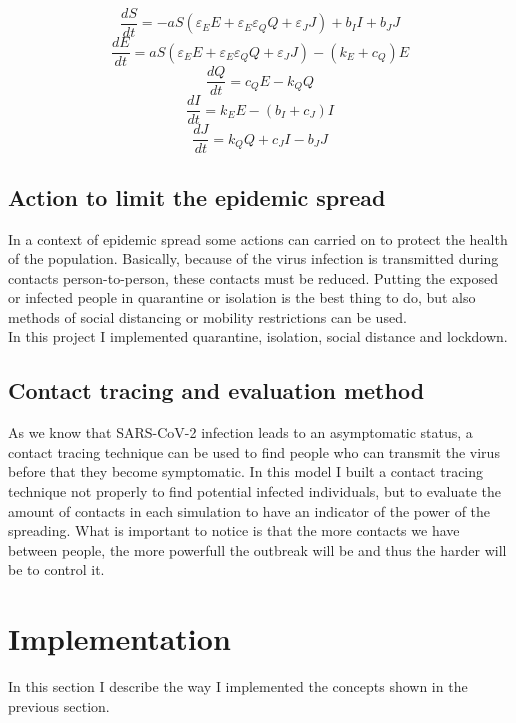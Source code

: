 \documentclass[12pt]{llncs}
\begin{document}
$$\frac{dS}{dt} = -aS(\varepsilon_EE + \varepsilon_E\varepsilon_QQ + \varepsilon_JJ) + b_II + b_JJ$$
$$\frac{dE}{dt} = aS(\varepsilon_EE + \varepsilon_E\varepsilon_QQ + \varepsilon_JJ) - (k_E + c_Q)E$$
$$\frac{dQ}{dt} = c_QE - k_QQ$$
$$\frac{dI}{dt} = k_EE - (b_I + c_J)I$$
$$\frac{dJ}{dt} = k_QQ + c_JI - b_JJ$$

\subsection{Action to limit the epidemic spread}
In a context of epidemic spread some actions can carried on to protect the health of the population. Basically, because of the virus infection is transmitted during contacts person-to-person, these contacts must be reduced. Putting the exposed or infected people in quarantine or isolation is the best thing to do, but also methods of social distancing or mobility restrictions can be used. \\
In this project I implemented quarantine, isolation, social distance and lockdown.

\subsection{Contact tracing and evaluation method}
As we know that SARS-CoV-2 infection leads to an asymptomatic status, a contact tracing technique can be used to find people who can transmit the virus before that they become symptomatic. In this model I built a contact tracing technique not properly to find potential infected individuals, but to evaluate the amount of contacts in each simulation to have an indicator of the power of the spreading. What is important to notice is that the more contacts we have between people, the more powerfull the outbreak will be and thus the harder will be to control it.

\section{Implementation}
In this section I describe the way I implemented the concepts shown in the previous section.
\end{document}
